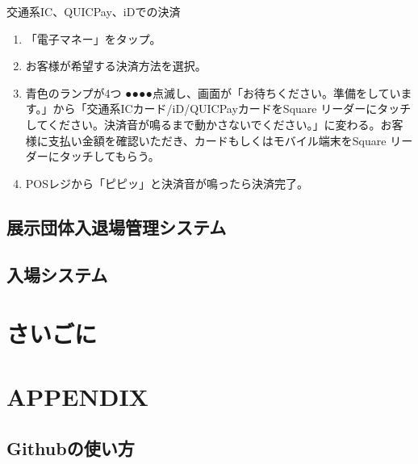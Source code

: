 \documentclass[dvipdfmx,jb5]{jarticle}
\begin{document}
\begin{itemize}
  交通系IC、QUICPay、iDでの決済
  \begin{enumerate}[手順1]
   \item 「電子マネー」をタップ。
   \item お客様が希望する決済方法を選択。
   \item 青色のランプが4つ{\color{blue} ●●●●}点滅し、画面が「お待ちください。準備をしています。」から「交通系ICカード/iD/QUICPayカードをSquare リーダーにタッチしてください。決済音が鳴るまで動かさないでください。」に変わる。お客様に支払い金額を確認いただき、カードもしくはモバイル端末をSquare リーダーにタッチしてもらう。
   \item POSレジから「ピピッ」と決済音が鳴ったら決済完了。
  \end{enumerate}
 \end{itemize}
 
\subsection{展示団体入退場管理システム}
\subsection{入場システム}
\section{さいごに}
\section{APPENDIX}
\subsection{Githubの使い方}
\end{document}

